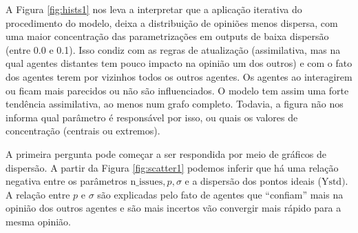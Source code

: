 %
%

    A Figura \ref{fig:hists1} nos leva a interpretar que a aplicação iterativa
    do procedimento do modelo, deixa a distribuição de opiniões menos dispersa,
    com uma maior concentração das parametrizações em outputs de baixa dispersão
    (entre 0.0 e 0.1). Isso condiz com as regras de atualização (assimilativa,
    mas na qual agentes distantes tem pouco impacto na opinião um dos outros) e
    com o fato dos agentes terem por vizinhos todos os outros agentes. Os
    agentes ao interagirem ou ficam mais parecidos ou não são influenciados. O
    modelo tem assim uma forte tendência assimilativa, ao menos num grafo
    completo. Todavia, a figura não nos informa qual parâmetro é responsável por
    isso, ou quais os valores de concentração (centrais ou extremos).

    A primeira pergunta pode começar a ser respondida por meio de gráficos de
    dispersão. A partir da Figura \ref{fig:scatter1} podemos inferir que há uma
    relação negativa entre os parâmetros \(\text{n\_issues}, p, \sigma \) e a
    dispersão dos pontos ideais (\( \text{Ystd}) \). A relação entre \(p\) e
    \(\sigma\) são explicadas pelo fato de agentes que ``confiam'' mais na opinião
    dos outros agentes e são mais incertos vão convergir mais rápido para a
    mesma opinião.

